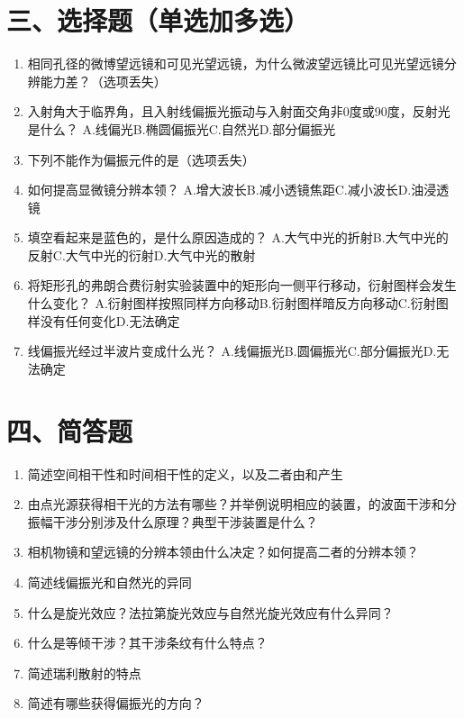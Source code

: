 \documentclass[12pt, a4paper]{article}
\theoremstyle{solution}
\begin{document}
\section*{三、选择题（单选加多选）}
\begin{enumerate}
    \item 相同孔径的微博望远镜和可见光望远镜，为什么微波望远镜比可见光望远镜分辨能力差？（选项丢失）
    \item 入射角大于临界角，且入射线偏振光振动与入射面交角非0度或90度，反射光是什么？
    A.线偏光\quad B.椭圆偏振光\quad C.自然光\quad D.部分偏振光
    \item 下列不能作为偏振元件的是（选项丢失）
    \item 如何提高显微镜分辨本领？
    A.增大波长\quad B.减小透镜焦距\quad C.减小波长\quad D.油浸透镜
    \item 填空看起来是蓝色的，是什么原因造成的？
    A.大气中光的折射\quad B.大气中光的反射\quad C.大气中光的衍射\quad D.大气中光的散射
    \item 将矩形孔的弗朗合费衍射实验装置中的矩形向一侧平行移动，衍射图样会发生什么变化？
    A.衍射图样按照同样方向移动\quad B.衍射图样暗反方向移动\quad C.衍射图样没有任何变化\quad D.无法确定
    \item 线偏振光经过半波片变成什么光？
    A.线偏振光\quad B.圆偏振光\quad C.部分偏振光\quad D.无法确定
\end{enumerate}
\section*{四、简答题}
\begin{enumerate}
    \item 简述空间相干性和时间相干性的定义，以及二者由和产生
    \item 由点光源获得相干光的方法有哪些？并举例说明相应的装置，的波面干涉和分振幅干涉分别涉及什么原理？典型干涉装置是什么？
    \item 相机物镜和望远镜的分辨本领由什么决定？如何提高二者的分辨本领？
    \item 简述线偏振光和自然光的异同
    \item 什么是旋光效应？法拉第旋光效应与自然光旋光效应有什么异同？
    \item 什么是等倾干涉？其干涉条纹有什么特点？
    \item 简述瑞利散射的特点
    \item 简述有哪些获得偏振光的方向？
\end{enumerate}
\end{document}
